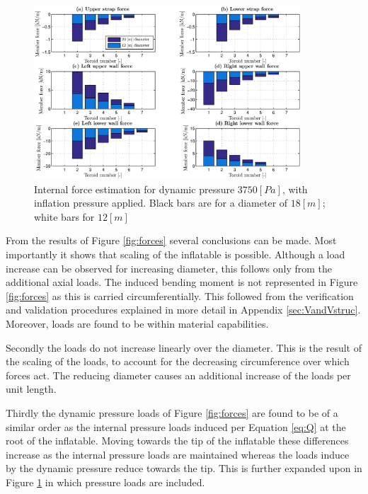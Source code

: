 \begin{figure}[h]
	\centering
	\includegraphics[width=0.89\textwidth]{./Figure/Structure/forces_test.eps}
	\caption[{Internal force estimation for dynamic pressure $3750 \left[Pa\right]$, with inflation pressure applied}]{Internal force estimation for dynamic pressure $3750 \left[Pa\right]$, with inflation pressure applied. Black bars are for a diameter of $18 \left[m\right]$; white bars for $12 \left[m\right]$}
	\label{fig:forcesp}
\vspace{-2mm}
\end{figure}

From the results of Figure \ref{fig:forces} several conclusions can be made. Most importantly it shows that scaling of the inflatable is possible. Although a load increase can be observed for increasing diameter, this follows only from the additional axial loads. The induced bending moment is not represented in Figure \ref{fig:forces} as this is carried circumferentially. This followed from the verification and validation procedures explained in more detail in Appendix \ref{sec:VandVstruc}. Moreover, loads are found to be within material capabilities.

Secondly the loads do not increase linearly over the diameter. This is the result of the scaling of the loads, to account for the decreasing circumference over which forces act. The reducing diameter causes an additional increase of the loads per unit length.

Thirdly the dynamic pressure loads of Figure \ref{fig:forces} are found to be of a similar order as the internal pressure loads induced per Equation \ref{eq:Q} at the root of the inflatable. Moving towards the tip of the inflatable these differences increase as the internal pressure loads are maintained whereas the loads induce by the dynamic pressure reduce towards the tip. This is further expanded upon in Figure \ref{fig:forcesp} in which pressure loads are included.

